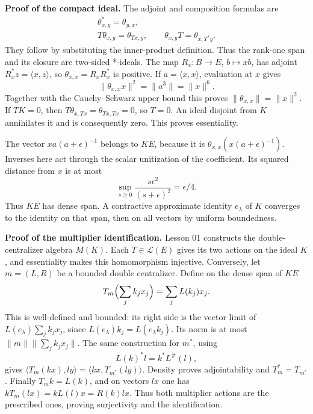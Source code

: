 \documentclass[
  11pt,
]{article}
\begin{document}
\textbf{Proof of the compact ideal.} The adjoint and composition
formulas are \[
\begin{gathered}
\theta_{x,y}^*=\theta_{y,x},\\
T\theta_{x,y}=\theta_{Tx,y},\qquad
\theta_{x,y}T=\theta_{x,T^*y}.
\end{gathered}
\] They follow by substituting the inner-product definition. Thus the
rank-one span and its closure are two-sided *-ideals. The map
\(R_x:B\to E\), \(b\mapsto xb\), has adjoint
\(R_x^*z=\langle x,z\rangle\), so \(\theta_{x,x}=R_xR_x^*\) is positive.
If \(a=\langle x,x\rangle\), evaluation at \(x\) gives \[
\|\theta_{x,x}x\|^2=\|a^3\|=\|x\|^6.
\] Together with the Cauchy--Schwarz upper bound this proves
\(\|\theta_{x,x}\|=\|x\|^2\). If \(TK=0\), then
\(T\theta_{x,Tx}=\theta_{Tx,Tx}=0\), so \(T=0\). An ideal disjoint from
\(K\) annihilates it and is consequently zero. This proves essentiality.

The vector \(xa(a+\epsilon)^{-1}\) belongs to \(KE\), because it is
\(\theta_{x,x}(x(a+\epsilon)^{-1})\). Inverses here act through the
scalar unitization of the coefficient. Its squared distance from \(x\)
is at most \[
\sup_{s\geq0}\frac{s\epsilon^2}{(s+\epsilon)^2}=\epsilon/4.
\] Thus \(KE\) has dense span. A contractive approximate identity
\(e_\lambda\) of \(K\) converges to the identity on that span, then on
all vectors by uniform boundedness.

\textbf{Proof of the multiplier identification.} Lesson 01 constructs
the double-centralizer algebra \(M(K)\). Each \(T\in\mathcal L(E)\)
gives its two actions on the ideal \(K\), and essentiality makes this
homomorphism injective. Conversely, let \(m=(L,R)\) be a bounded double
centralizer. Define on the dense span of \(KE\) \[
T_m\Bigl(\sum_jk_jx_j\Bigr)=\sum_jL(k_j)x_j.
\] This is well-defined and bounded: its right side is the vector limit
of \(L(e_\lambda)\sum_jk_jx_j\), since
\(L(e_\lambda)k_j=L(e_\lambda k_j)\). Its norm is at most
\(\|m\|\|\sum_jk_jx_j\|\). The same construction for \(m^*\), using \[
L(k)^*l=k^*L^{\#}(l),
\] gives \(\langle T_m(kx),ly\rangle=\langle kx,T_{m^*}(ly)\rangle\).
Density proves adjointability and \(T_m^*=T_{m^*}\). Finally
\(T_mk=L(k)\), and on vectors \(lx\) one has \(kT_m(lx)=kL(l)x=R(k)lx\).
Thus both multiplier actions are the prescribed ones, proving
surjectivity and the identification.
\end{document}
